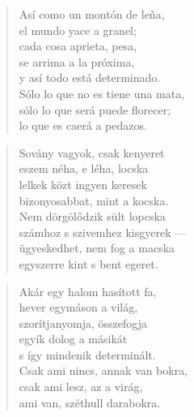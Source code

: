 \bigskip



\begin{verse}
  Así como un montón de leña, \\
  el mundo yace a granel; \\
  cada cosa aprieta, pesa, \\
  se arrima a la próxima, \\
  y así todo está determinado. \\
  Sólo lo que no es tiene una mata, \\
  sólo lo que será puede florecer; \\
  lo que es caerá a pedazos.
\end{verse}

\newpage

\vspace*{-15mm}
\centeredornament



\begin{verse}
  Sovány vagyok, csak kenyeret \\
  eszem néha, e léha, locska \\
  lelkek közt ingyen keresek \\
  bizonyosabbat, mint a kocska. \\
  Nem dörgölődzik sült lopcska \\
  számhoz s szivemhez kisgyerek --- \\
  ügyeskedhet, nem fog a macska \\
  egyszerre kint s bent egeret.
\end{verse}

\bigskip


\begin{verse}
  Akár egy halom hasított fa, \\
  hever egymáson a világ, \\
  szorítjanyomja, összefogja \\
  egyík dolog a másikát \\
  s így mindenik determinált. \\
  Csak ami nincs, annak van bokra, \\
  csak ami lesz, az a virág, \\
  ami van, széthull darabokra.
\end{verse}


